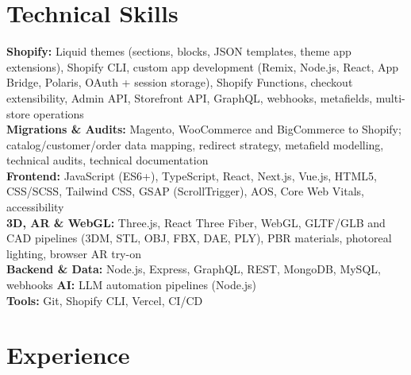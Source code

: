 \documentclass[10pt]{article}
\begin{document}
\section*{Technical Skills}
\textbf{Shopify:} Liquid themes (sections, blocks, JSON templates, theme app extensions), Shopify CLI, custom app development (Remix, Node.js, React, App Bridge, Polaris, OAuth + session storage), Shopify Functions, checkout extensibility, Admin API, Storefront API, GraphQL, webhooks, metafields, multi-store operations \\
\textbf{Migrations \& Audits:} Magento, WooCommerce and BigCommerce to Shopify; catalog/customer/order data mapping, redirect strategy, metafield modelling, technical audits, technical documentation \\
\textbf{Frontend:} JavaScript (ES6+), TypeScript, React, Next.js, Vue.js, HTML5, CSS/SCSS, Tailwind CSS, GSAP (ScrollTrigger), AOS, Core Web Vitals, accessibility \\
\textbf{3D, AR \& WebGL:} Three.js, React Three Fiber, WebGL, GLTF/GLB and CAD pipelines (3DM, STL, OBJ, FBX, DAE, PLY), PBR materials, photoreal lighting, browser AR try-on \\
\textbf{Backend \& Data:} Node.js, Express, GraphQL, REST, MongoDB, MySQL, webhooks \quad \textbf{AI:} LLM automation pipelines (Node.js) \\
\textbf{Tools:} Git, Shopify CLI, Vercel, CI/CD \\

\section*{Experience}
\end{document}
